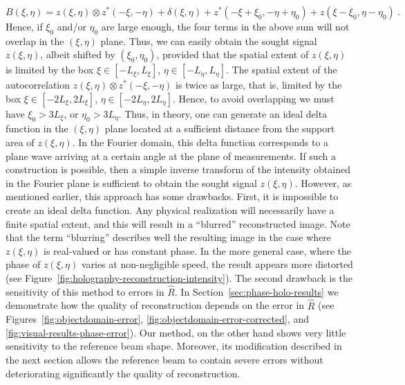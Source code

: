 \begin{equation}
  \label{eq:phase-holo-15}
  B(\xi,\eta) =
  z(\xi,\eta) \otimes z^{*}(-\xi,-\eta) + \delta(\xi,\eta) +
  z^{*}(-\xi+\xi_{0}, -\eta+\eta_{0}) + z(\xi-\xi_{0}, \eta-\eta_{0})\ .
\end{equation}
Hence, if $\xi_{0}$ and/or $\eta_{0}$ are large enough, the four terms
in the above sum will not overlap in the $(\xi,\eta)$ plane. Thus, we
can easily obtain the sought signal $z(\xi,\eta)$, albeit shifted by
$(\xi_{0}, \eta_{0})$, provided that the spatial extent of $z(\xi,\eta)$ is
limited by the box $\xi\in[-L_{\xi}, L_{\xi}]$, $\eta\in[-L_{\eta},L_{\eta}]$.
The spatial extent of the autocorrelation $z(\xi,\eta) \otimes
z^{*}(-\xi,-\eta)$ is twice as large, that is, limited by the box
$\xi\in[-2L_{\xi}, 2L_{\xi}]$, $\eta\in[-2L_{\eta},2L_{\eta}]$. Hence, to avoid
overlapping we must have $\xi_{0} > 3L_{\xi}$, or $\eta_{0}>3L_{\eta}$.
Thus, in theory, one can generate an ideal delta function in the
$(\xi,\eta)$ plane located at a sufficient distance from the support area
of $z(\xi,\eta)$. In the Fourier domain, this delta function
corresponds to a plane wave arriving at a certain angle at the
plane of measurements. If such a construction is possible, then a
simple inverse transform of the intensity obtained in the Fourier
plane is sufficient to obtain the sought signal $z(\xi,\eta)$. However,
as mentioned earlier, this approach has some drawbacks. First, it
is impossible to create an ideal delta function. Any physical
realization will necessarily have a finite spatial extent, and
this will result in a ``blurred'' reconstructed image. Note that
the term ``blurring'' describes well the resulting image in the
case where $z(\xi,\eta)$ is real-valued or has constant phase. In the
more general case, where the phase of $z(\xi,\eta)$ varies at
non-negligible speed, the result appears more distorted (see
Figure~\ref{fig:holography-reconstruction-intensity}).
The second
drawback is the sensitivity of this method to errors in $\hat{R}$.
In Section~\ref{sec:phase-holo-results} we demonstrate how the quality of
reconstruction depends on the error in $\hat{R}$ (see
Figures~\ref{fig:objectdomain-error}, 
\ref{fig:objectdomain-error-corrected}, and
\ref{fig:visual-results-phase-error}). Our method, on the other
hand shows very little sensitivity to the reference beam shape.
Moreover, its modification described in the next section allows
the reference beam to contain severe errors without deteriorating
significantly the quality of reconstruction.

